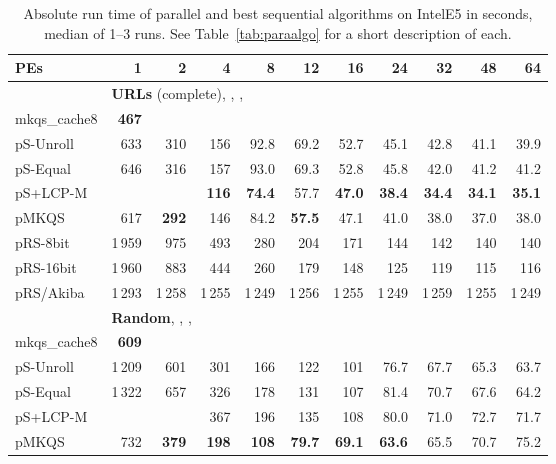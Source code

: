 \documentclass[a4paper]{myjournal}
\begin{document}
\begin{table}\centering\small
\caption{Absolute run time of parallel and best sequential algorithms on IntelE5 in seconds, median of 1--3 runs. See Table~\ref{tab:paraalgo} for a short description of each.}\label{tab:absrun-IntelE5}
\def\tabcolsep{3.6pt}
\begin{tabular}{l|*{10}{r}|@{}}
PEs & 1   & 2 & 4 & 8 & 12 & 16 & 24 & 32 & 48 & 64 \\ \hline
& \multicolumn{10}{l|}{\textbf{URLs} (complete), , , } \\ \cline{2-11}
mkqs\_cache8 & \bf 467 &  &  &  &  &  &  &  &  &  \\
pS-Unroll &    633 &     310 &     156 &     92.8 &     69.2 &     52.7 &     45.1 &     42.8 &     41.1 &     39.9 \\
 pS-Equal &    646 &     316 &     157 &     93.0 &     69.3 &     52.8 &     45.8 &     42.0 &     41.2 &     41.2 \\
 pS+LCP-M &        &         & \bf 116 & \bf 74.4 &     57.7 & \bf 47.0 & \bf 38.4 & \bf 34.4 & \bf 34.1 & \bf 35.1 \\
        pMKQS &    617 & \bf 292 &     146 &     84.2 & \bf 57.5 &     47.1 &     41.0 &     38.0 &     37.0 &     38.0 \\
     pRS-8bit & 1\,959 &     975 &     493 &      280 &      204 &      171 &      144 &      142 &      140 &      140 \\
    pRS-16bit & 1\,960 &     883 &     444 &      260 &      179 &      148 &      125 &      119 &      115 &      116 \\
    pRS/Akiba & 1\,293 &  1\,258 &  1\,255 &   1\,249 &   1\,256 &   1\,255 &   1\,249 &   1\,259 &   1\,255 &   1\,249 \\ \hline
& \multicolumn{10}{l|}{\textbf{Random}, , , } \\ \cline{2-11}
mkqs\_cache8 & \bf 609 &  &  &  &  &  &  &  &  &  \\
pS-Unroll & 1\,209 &     601 &     301 &     166 &      122 &      101 &     76.7 &     67.7 &     65.3 &     63.7 \\
 pS-Equal & 1\,322 &     657 &     326 &     178 &      131 &      107 &     81.4 &     70.7 &     67.6 &     64.2 \\
 pS+LCP-M &        &         &     367 &     196 &      135 &      108 &     80.0 &     71.0 &     72.7 &     71.7 \\
        pMKQS &    732 & \bf 379 & \bf 198 & \bf 108 & \bf 79.7 & \bf 69.1 & \bf 63.6 &     65.5 &     70.7 &     75.2 \\

\end{tabular}
\end{table}
\end{document}
